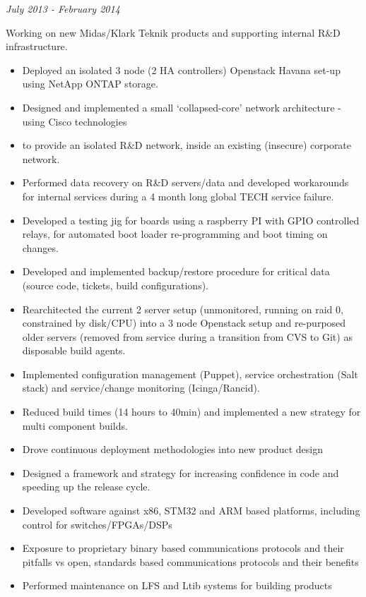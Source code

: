 \emph{July 2013 - February 2014}

Working on new Midas/Klark Teknik products and supporting internal R\&D
infrastructure.

\begin{itemize}
\itemsep1pt\parskip0pt
\item
  Deployed an isolated 3 node (2 HA controllers) Openstack Havana set-up
  using NetApp ONTAP storage.
\item
  Designed and implemented a small `collapsed-core' network architecture
  - using Cisco technologies
\item
  to provide an isolated R\&D network, inside an existing (insecure)
  corporate network.
\item
  Performed data recovery on R\&D servers/data and developed workarounds
  for internal services during a 4 month long global TECH service
  failure.
\item
  Developed a testing jig for boards using a raspberry PI with GPIO
  controlled relays, for automated boot loader re-programming and boot
  timing on changes.
\item
  Developed and implemented backup/restore procedure for critical data
  (source code, tickets, build configurations).
\item
  Rearchitected the current 2 server setup (unmonitored, running on raid
  0, constrained by disk/CPU) into a 3 node Openstack setup and
  re-purposed older servers (removed from service during a transition
  from CVS to Git) as disposable build agents.
\item
  Implemented configuration management (Puppet), service orchestration
  (Salt stack) and service/change monitoring (Icinga/Rancid).
\item
  Reduced build times (14 hours to 40min) and implemented a new strategy
  for multi component builds.
\item
  Drove continuous deployment methodologies into new product design
\item
  Designed a framework and strategy for increasing confidence in code
  and speeding up the release cycle.
\item
  Developed software against x86, STM32 and ARM based platforms,
  including control for switches/FPGAs/DSPs
\item
  Exposure to proprietary binary based communications protocols and
  their pitfalls vs open, standards based communications protocols and
  their benefits
\item
  Performed maintenance on LFS and Ltib systems for building products

\end{itemize}
